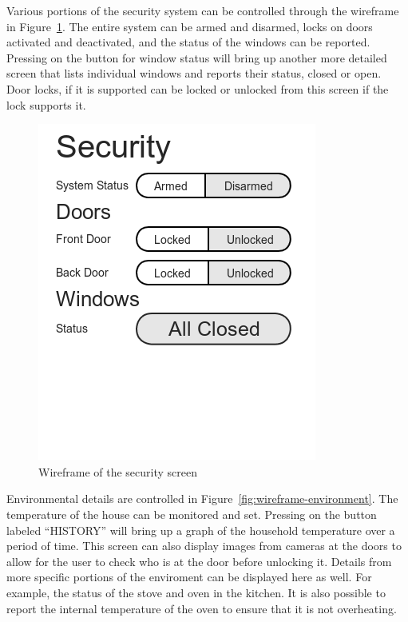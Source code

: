 \documentclass{report}
\begin{document}
Various portions of the security system can be controlled through the wireframe
in Figure~\ref{fig:wireframe-security}. The entire system can be armed and
disarmed, locks on doors activated and deactivated, and the status of the
windows can be reported. Pressing on the button for window status will bring up
another more detailed screen that lists individual windows and reports their
status, closed or open. Door locks, if it is supported can be locked or
unlocked from this screen if the lock supports it.


\begin{figure}[H]
    \centering
    \includegraphics[scale=0.5]{mock_security}
    \caption[Wireframe of the security screen]
            {Wireframe of the security screen}
    \label{fig:wireframe-security}
\end{figure}

Environmental details are controlled in Figure~\ref{fig:wireframe-environment}. The
temperature of the house can be monitored and set. Pressing on the button
labeled ``HISTORY'' will bring up a graph of the household temperature over a
period of time. This screen can also display images from cameras at the doors
to allow for the user to check who is at the door before unlocking it.
Details from more specific portions of the enviroment can be displayed here as
well. For example, the status of the stove and oven in the kitchen. It is also
possible to report the internal temperature of the oven to ensure that it is
not overheating.
\end{document}
